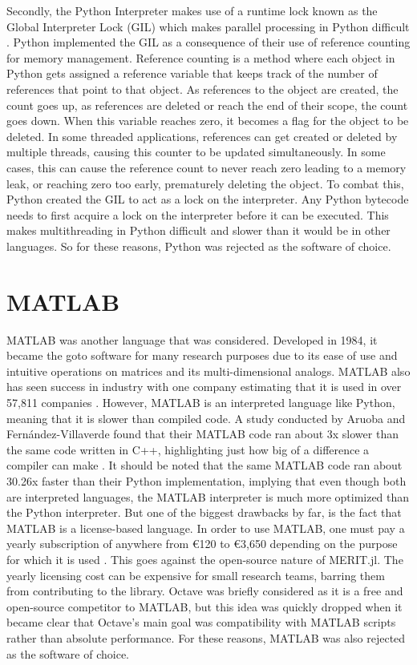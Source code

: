 Secondly, the Python Interpreter makes use of a runtime lock known as the Global Interpreter Lock (GIL) which makes
parallel processing in Python difficult \cite{ajitsariaWhatPythonGlobal}. Python implemented the GIL as a consequence of
their use of reference counting for memory management. Reference counting is a method where each object in Python gets
assigned a reference variable that keeps track of the number of references that point to that object. As references to
the object are created, the count goes up, as references are deleted or reach the end of their scope, the count goes
down. When this variable reaches zero, it becomes a flag for the object to be deleted. In some threaded applications,
references can get created or deleted by multiple threads, causing this counter to be updated simultaneously. In some
cases, this can cause the reference count to never reach zero leading to a memory leak, or reaching zero too early,
prematurely deleting the object. To combat this, Python created the GIL to act as a lock on the interpreter. Any Python
bytecode needs to first acquire a lock on the interpreter before it can be executed. This makes multithreading in Python
difficult and slower than it would be in other languages. So for these reasons, Python was rejected as the software of
choice.

\section{MATLAB}
MATLAB was another language that was considered. Developed in 1984, it became the goto software for many research
purposes due to its ease of use and intuitive operations on matrices and its multi-dimensional analogs. MATLAB also has
seen success in industry with one company estimating that it is used in over 57,811 companies
\cite{CompaniesUsingMATLAB}. However, MATLAB is an interpreted language like Python, meaning that it is slower than
compiled code. A study conducted by Aruoba and Fernández-Villaverde found that their MATLAB code ran about 3x slower
than the same code written in C++, highlighting just how big of a difference a compiler can make
\cite{aruobaComparisonProgrammingLanguages2018}. It should be noted that the same MATLAB code ran about 30.26x faster
than their Python implementation, implying that even though both are interpreted languages, the MATLAB interpreter is
much more optimized than the Python interpreter. But one of the biggest drawbacks by far, is the fact that MATLAB is a
license-based language. In order to use MATLAB, one must pay a yearly subscription of anywhere from €120 to €3,650
depending on the purpose for which it is used \cite{MATLABPricing}. This goes against the open-source nature of
MERIT.jl. The yearly licensing cost can be expensive for small research teams, barring them from contributing to the
library. Octave was briefly considered as it is a free and open-source competitor to MATLAB, but this idea was quickly
dropped when it became clear that Octave's main goal was compatibility with MATLAB scripts rather than absolute
performance. For these reasons, MATLAB was also rejected as the software of choice.

